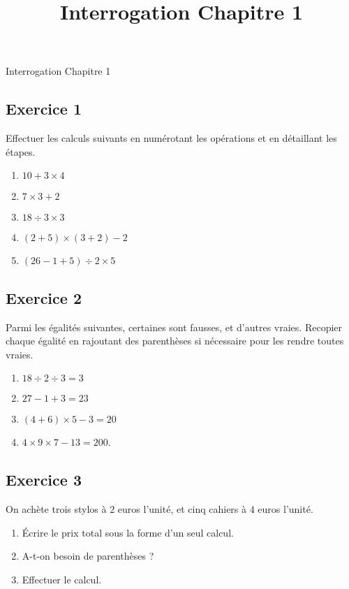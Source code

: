 \documentclass[14 pt]{extarticle}
\title{Interrogation Chapitre 1}
\date{}
\theoremstyle{plain}
\begin{document}
\begin{center}{\Large Interrogation Chapitre 1}\\ 
 \end{center}
 
  

\subsection*{Exercice 1}

Effectuer les calculs suivants en numérotant les opérations et en détaillant les étapes. \begin{enumerate}
\item $10 + 3 \times 4$
\item $ 7 \times 3 + 2$
\item $18\div 3 \times 3$
\item $(2+5) \times (3+2) - 2$
\item $ (26 - 1 + 5)\div 2 \times 5$
\end{enumerate}

\subsection*{Exercice 2}

Parmi les égalités suivantes, certaines sont fausses, et d'autres vraies. Recopier chaque égalité en rajoutant des parenthèses si nécessaire pour les rendre toutes vraies.

\begin{enumerate}
\item $18 \div 2 \div 3 = 3$
\item $27 - 1 + 3 = 23$
\item $(4+ 6 )\times 5-3 = 20$
\item $4 \times 9\times 7 - 13 = 200$. 
\end{enumerate}
 

\subsection*{Exercice 3}

On achète trois stylos à $2$ euros l'unité, et cinq cahiers à $4$ euros l'unité. 

\begin{enumerate}
\item Écrire le prix total sous la forme d'un seul calcul. 
\item A-t-on besoin de parenthèses ?
\item Effectuer le calcul. 
\end{enumerate}
 
\end{document}
